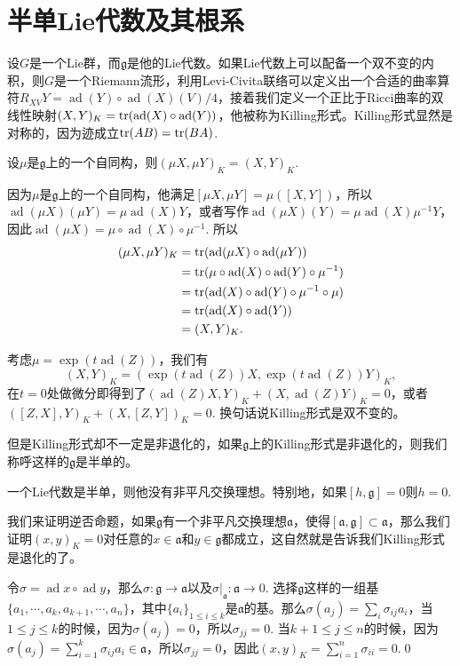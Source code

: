 \documentclass[9pt]{extarticle}
\newcommand{\lag}{{\mathfrak{g}}}
\DeclareMathOperator{\ad}{ad}
\begin{document}
\section{半单Lie代数及其根系}

\para 设$G$是一个Lie群，而$\lag$是他的Lie代数。如果Lie代数上可以配备一个双不变的内积，则$G$是一个Riemann流形，利用Levi-Civita联络可以定义出一个合适的曲率算符$R_{XV}Y=\ad(Y)\circ \ad(X)(V)/4$，接着我们定义一个正比于Ricci曲率的双线性映射$(X,Y)_K=\tr(\ad(X)\circ \ad(Y))$，他被称为Killing形式。Killing形式显然是对称的，因为迹成立$\operatorname{tr}(AB)=\operatorname{tr}(BA)$.

\para 设$\mu$是$\lag$上的一个自同构，则$(\mu X,\mu Y)_K=(X,Y)_K$.

因为$\mu$是$\lag$上的一个自同构，他满足$[\mu X,\mu Y]=\mu([X,Y])$，所以$\ad(\mu X)(\mu Y)=\mu\ad(X)Y$，或者写作$\ad(\mu X)(Y)=\mu\ad(X)\mu^{-1}Y$，因此$\ad(\mu X)=\mu\circ \ad(X)\circ \mu^{-1}$. 所以
\begin{align*}
	(\mu X,\mu Y)_K&=\tr(\ad(\mu X)\circ \ad(\mu Y))\\
	&=\tr(\mu\circ \ad(X)\circ \ad(Y)\circ \mu^{-1})\\&=\tr(\ad(X)\circ \ad(Y)\circ \mu^{-1}\circ \mu)\\&=\tr(\ad(X)\circ \ad(Y))\\&=(X,Y)_K.
\end{align*}

考虑$\mu=\exp(t\ad(Z))$，我们有
\[
	(X,Y)_K=(\exp(t\ad(Z))X,\exp(t\ad(Z))Y)_K,
\]
在$t=0$处做微分即得到了$(\ad(Z)X,Y)_K+(X,\ad(Z)Y)_K=0$，或者$([Z,X],Y)_K+(X,[Z,Y])_K=0$. 换句话说Killing形式是双不变的。

但是Killing形式却不一定是非退化的，如果$\lag$上的Killing形式是非退化的，则我们称呼这样的$\lag$是半单的。

\pro 一个Lie代数是半单，则他没有非平凡交换理想。特别地，如果$[h,\lag]=0$则$h=0$.

\proof 我们来证明逆否命题，如果$\lag$有一个非平凡交换理想$\mathfrak{a}$，使得$[\mathfrak{a},\lag]\subset \mathfrak{a}$，那么我们证明$(x,y)_K=0$对任意的$x\in \mathfrak{a}$和$y\in \lag$都成立，这自然就是告诉我们Killing形式是退化的了。

令$\sigma=\ad x\circ \ad y$，那么$\sigma:\lag\to \mathfrak{a}$以及$\sigma|_\mathfrak{a}:\mathfrak{a}\to 0$. 选择$\lag$这样的一组基$\{a_1,\cdots,a_k,a_{k+1},\cdots,a_{n}\}$，其中$\{a_i\}_{1\leq i \leq k}$是$\mathfrak{a}$的基。那么$\sigma(a_j)=\sum_i\sigma_{ij} a_i$，当$1\leq j\leq k$的时候，因为$\sigma(a_j)=0$，所以$\sigma_{jj}=0$. 当$k+1\leq j \leq n$的时候，因为$\sigma(a_j)=\sum_{i=1}^k\sigma_{ij} a_i\in\mathfrak{a}$，所以$\sigma_{jj}=0$，因此$(x,y)_K=\sum_{i=1}^n\sigma_{ii}=0$.\qed
\end{document}
